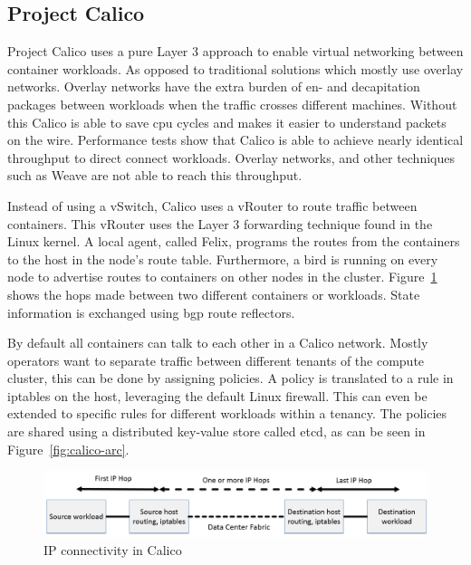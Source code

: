 \subsection{Project Calico}
Project Calico uses a pure Layer 3 approach to enable virtual networking between container workloads. As opposed to traditional solutions which mostly use overlay networks. Overlay networks have the extra burden of en- and decapitation packages between workloads when the traffic crosses different machines. Without this Calico is able to save \gls{cpu} cycles and makes it easier to understand packets on the wire. Performance tests\cite{dzone, dataplane, chunqi} show that Calico is able to achieve nearly identical throughput to direct connect workloads. Overlay networks, and other techniques such as Weave\cite{weave} are not able to reach this throughput.

Instead of using a vSwitch, Calico uses a vRouter to route traffic between containers. This vRouter uses the Layer 3 forwarding technique found in the Linux kernel. A local agent, called Felix, programs the routes from the containers to the host in the node's route table. Furthermore, a \gls{bird} is running on every node to advertise routes to containers on other nodes in the cluster. Figure~\ref{fig:hops} shows the hops made between two different containers or workloads. State information is exchanged using \gls{bgp} route reflectors.

By default all containers can talk to each other in a Calico network. Mostly operators want to separate traffic between different tenants of the compute cluster, this can be done by assigning policies. A policy is translated to a rule in iptables\cite{iptables} on the host, leveraging the default Linux firewall. This can even be extended to specific rules for different workloads within a tenancy. The policies are shared using a distributed key-value store called etcd\cite{etcd}, as can be seen in Figure~\ref{fig:calico-arc}.

\begin{figure}
    \centering
    \includegraphics[scale=0.35]{images/calico-hops}
    \caption{IP connectivity in Calico\cite{calico_learn}}
    \label{fig:hops}
\end{figure}

